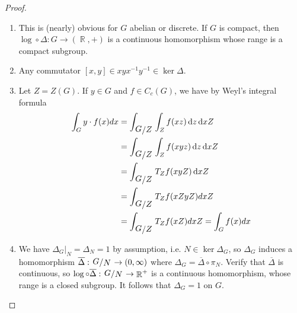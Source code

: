 \documentclass[11pt, a4paper]{memoir}
\DeclareMathOperator{\R}{{\mathbb{R}}}
\theoremstyle{change}
\theoremstyle{plain}
\theoremstyle{nonumberplain}
\newtheorem{proof}{Proof}
\newcommand{\quot}[2]{\mathchoice{\left.\raisebox{0.14em}{$#1$}\middle/\raisebox{-0.14em}{$#2$}\right.}
                                 {\left.\raisebox{0.08em}{$#1$}\middle/\raisebox{-0.08em}{$#2$}\right.}
                                 {\left.\raisebox{0.03em}{$#1$}\middle/\raisebox{-0.03em}{$#2$}\right.}
                                 {\left.\raisebox{0em}{$#1$}\middle/\raisebox{0em}{$#2$}\right.}}
\renewcommand{\d}[1]{\ensuremath{\operatorname{d}\!{#1}}}
\numberwithin{equation}{section}
\begin{document}
\begin{proof}
    \begin{enumerate}[nl,r]
        \item This is (nearly) obvious for $G$ abelian or discrete.
            If $G$ is compact, then $\log\circ\Delta:G\to(\R,+)$ is a continuous homomorphism whose range is a compact subgroup.
        \item Any commutator $[x,y]\in xyx^{-1}y^{-1}\in\ker\Delta$.
        \item Let $Z=Z(G)$.
            If $y\in G$ and $f\in C_c(G)$, we have by Weyl's integral formula
            \begin{align*}
                \int_G y\cdot f(x)dx &= \int_{\quot{G}{Z}}\int_Z f(xz)\d{z}\d{xZ}\\
                                     &= \int_{\quot{G}{Z}}\int_Zf(xyz)\d{z}\d{xZ}\\
                                     &= \int_{\quot{G}{Z}}T_Zf(xyZ)\d{xZ}\\
                                     &= \int_{\quot{G}{Z}}T_Zf(xZyZ)dxZ\\
                                     &= \int_{\quot{G}{Z}}T_Zf(xZ)dxZ=\int_Gf(x)dx
            \end{align*}
        \item We have $\Delta_G|_N=\Delta_N=1$ by assumption, i.e. $N\in\ker\Delta_G$, so $\Delta_G$ induces a homomorphism $\overline{\Delta}:\quot{G}{N}\to(0,\infty)$ where $\Delta_G=\overline{\Delta}\circ\pi_N$.
            Verify that $\overline{\Delta}$ is continuous, so $\log\circ\overline{\Delta}:\quot{G}{N}\to\R^+$ is a continuous homomorphism, whose range is a closed subgroup.
            It follows that $\Delta_G=1$ on $G$.
    \end{enumerate}
\end{proof}
\end{document}
